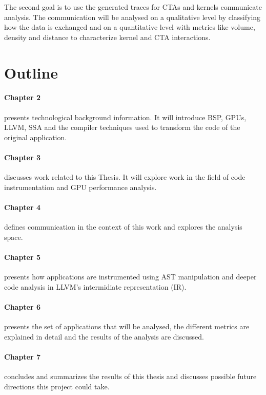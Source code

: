 The second goal is to use the generated traces for CTAs and kernels communicate analysis. The communication will be analysed on a qualitative level by classifying how the data is exchanged and on a quantitative level with metrics like volume, density and distance to characterize kernel and CTA interactions.


\section{Outline}
	\paragraph{Chapter 2} presents technological background information. It will introduce BSP, GPUs, LLVM, SSA and the compiler techniques used to transform the code of the original application.
	\paragraph{Chapter 3} discusses work related to this Thesis. It will explore work in the field of code instrumentation and GPU performance analysis.
	\paragraph{Chapter 4} defines communication in the context of this work and explores the analysis space.
	\paragraph{Chapter 5} presents how applications are instrumented using AST manipulation and deeper code analysis in LLVM's intermidiate representation (IR).
	\paragraph{Chapter 6} presents the set of applications that will be analysed, the different metrics are explained in detail and the results of the analysis are discussed.
	\paragraph{Chapter 7} concludes and summarizes the results of this thesis and discusses possible future directions this project could take.
